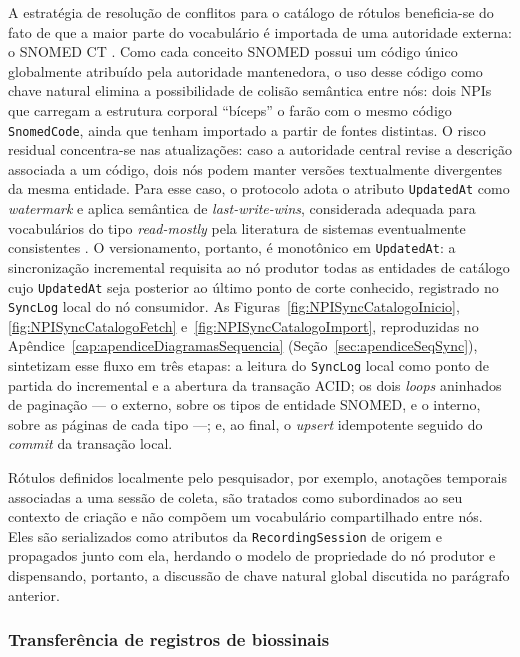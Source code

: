 A estratégia de resolução de conflitos para o catálogo de rótulos beneficia-se do fato de que a maior parte do vocabulário é importada de uma autoridade externa: o SNOMED CT \cite{SNOMEDCT, SNOMEDCTOverview}. Como cada conceito SNOMED possui um código único globalmente atribuído pela autoridade mantenedora, o uso desse código como chave natural elimina a possibilidade de colisão semântica entre nós: dois NPIs que carregam a estrutura corporal ``bíceps'' o farão com o mesmo código \texttt{SnomedCode}, ainda que tenham importado a partir de fontes distintas. O risco residual concentra-se nas atualizações: caso a autoridade central revise a descrição associada a um código, dois nós podem manter versões textualmente divergentes da mesma entidade. Para esse caso, o protocolo adota o atributo \texttt{UpdatedAt} como \textit{watermark} e aplica semântica de \textit{last-write-wins}, considerada adequada para vocabulários do tipo \textit{read-mostly} pela literatura de sistemas eventualmente consistentes \cite{vogels2009eventually}. O versionamento, portanto, é monotônico em \texttt{UpdatedAt}: a sincronização incremental requisita ao nó produtor todas as entidades de catálogo cujo \texttt{UpdatedAt} seja posterior ao último ponto de corte conhecido, registrado no \texttt{SyncLog} local do nó consumidor. As Figuras~\ref{fig:NPISyncCatalogoInicio}, \ref{fig:NPISyncCatalogoFetch} e~\ref{fig:NPISyncCatalogoImport}, reproduzidas no Apêndice~\ref{cap:apendiceDiagramasSequencia} (Seção~\ref{sec:apendiceSeqSync}), sintetizam esse fluxo em três etapas: a leitura do \texttt{SyncLog} local como ponto de partida do incremental e a abertura da transação ACID; os dois \textit{loops} aninhados de paginação --- o externo, sobre os tipos de entidade SNOMED, e o interno, sobre as páginas de cada tipo ---; e, ao final, o \textit{upsert} idempotente seguido do \textit{commit} da transação local.

Rótulos definidos localmente pelo pesquisador, por exemplo, anotações temporais associadas a uma sessão de coleta, são tratados como subordinados ao seu contexto de criação e não compõem um vocabulário compartilhado entre nós. Eles são serializados como atributos da \texttt{RecordingSession} de origem e propagados junto com ela, herdando o modelo de propriedade do nó produtor e dispensando, portanto, a discussão de chave natural global discutida no parágrafo anterior.

\subsubsection{Transferência de registros de biossinais}

